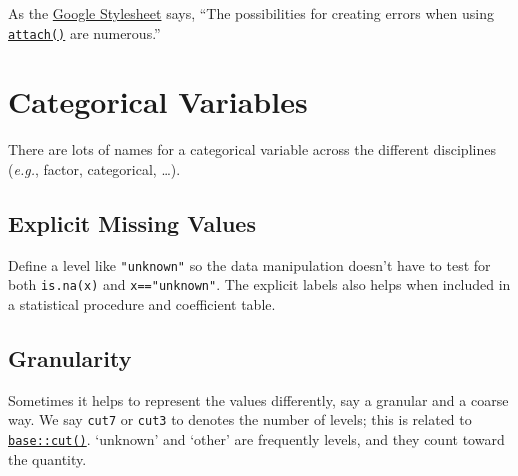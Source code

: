 \documentclass[
]{book}
\begin{document}
As the \href{https://google.github.io/styleguide/Rguide.html\#dont-use-attach}{Google Stylesheet} says, ``The possibilities for creating errors when using \href{https://stat.ethz.ch/R-manual/R-devel/library/base/html/attach.html}{\texttt{attach()}} are numerous.''

\hypertarget{style-factor}{%
\section{Categorical Variables}\label{style-factor}}

There are lots of names for a categorical variable across the different disciplines (\emph{e.g.}, factor, categorical, \ldots).

\hypertarget{style-factor-unknown}{%
\subsection{Explicit Missing Values}\label{style-factor-unknown}}

Define a level like \texttt{"unknown"} so the data manipulation doesn't have to test for both \texttt{is.na(x)} and \texttt{x=="unknown"}. The explicit labels also helps when included in a statistical procedure and coefficient table.

\hypertarget{style-factor-granularity}{%
\subsection{Granularity}\label{style-factor-granularity}}

Sometimes it helps to represent the values differently, say a granular and a coarse way. We say \texttt{cut7} or \texttt{cut3} to denotes the number of levels; this is related to \href{https://stat.ethz.ch/R-manual/R-devel/library/base/html/cut.html}{\texttt{base::cut()}}. `unknown' and `other' are frequently levels, and they count toward the quantity.
\end{document}

